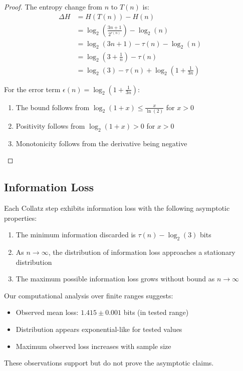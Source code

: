 \begin{proof}
The entropy change from $n$ to $T(n)$ is:
\begin{align*}
\Delta H &= H(T(n)) - H(n) \\
&= \log_2\left(\frac{3n + 1}{2^{\tau(n)}}\right) - \log_2(n) \\
&= \log_2(3n + 1) - \tau(n) - \log_2(n) \\
&= \log_2(3 + \frac{1}{n}) - \tau(n) \\
&= \log_2(3) - \tau(n) + \log_2(1 + \frac{1}{3n})
\end{align*}

For the error term $\epsilon(n) = \log_2(1 + \frac{1}{3n})$:
\begin{enumerate}
\item The bound follows from $\log_2(1+x) \leq \frac{x}{\ln(2)}$ for $x > 0$
\item Positivity follows from $\log_2(1+x) > 0$ for $x > 0$
\item Monotonicity follows from the derivative being negative
\end{enumerate}
\end{proof}

\subsection{Information Loss}

\begin{theorem}
Each Collatz step exhibits information loss with the following asymptotic properties:
\begin{enumerate}
\item The minimum information discarded is $\tau(n) - \log_2(3)$ bits
\item As $n \to \infty$, the distribution of information loss approaches a stationary distribution
\item The maximum possible information loss grows without bound as $n \to \infty$
\end{enumerate}

\begin{remark}
Our computational analysis over finite ranges suggests:
\begin{itemize}
\item Observed mean loss: $1.415 \pm 0.001$ bits (in tested range)
\item Distribution appears exponential-like for tested values
\item Maximum observed loss increases with sample size
\end{itemize}
These observations support but do not prove the asymptotic claims.
\end{remark}
\end{theorem}


